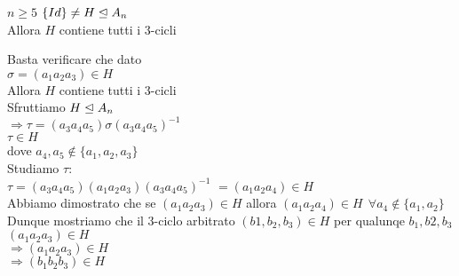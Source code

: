 \documentclass[12px]{article}
\begin{document}
{\begin{teo}
		$n\geq 5$ $\{Id\}\neq H\trianglelefteq A_n$\\
		Allora  $H$ contiene tutti i $3$-cicli\\
	\end{teo}
	\begin{dimo}
		Basta verificare che dato \\
		$\sigma = (a_1a_2a_3)\in H$\\
		Allora $H$ contiene tutti i $3$-cicli\\
		Sfruttiamo $H\trianglelefteq A_n$\\
		$ \Rightarrow \tau = (a_3a_4a_5)\sigma(a_3a_4a_5)^{-1}$ \\
		$\tau\in H$\\
		dove  $a_4,a_5\not\in\{a_1,a_2,a_3\}$\\
		Studiamo $\tau:$\\
		$\tau = (a_3a_4a_5)(a_1a_2a_3)(a_3a_4a_5)^{-1}$ 
		$= (a_1a_2a_4)\in H$\\
		Abbiamo dimostrato che se $(a_1a_2a_3)\in H$ allora $(a_1a_2a_4)\in H \ \ \forall a_4\not\in\{a_1,a_2\}$\\
		Dunque mostriamo che il $3$-ciclo arbitrato $(b1,b_2,b_3)\in H$ per qualunqe $b_1,b2,b_3$\\
		$(a_1a_2a_3)\in H$\\
		$ \Rightarrow (a_1a_2a_3)\in H$\\
		$ \Rightarrow  (b_1b_2b_3)\in H$ \\


\end{dimo}}
\end{document}
